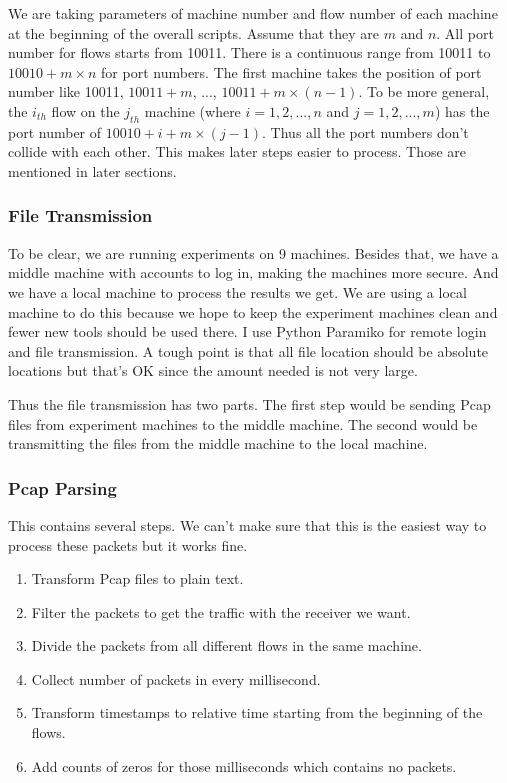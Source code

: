 \documentclass[12pt,a4paper]{article}
\begin{document}
We are taking parameters of machine number and flow number of each machine at the beginning of the overall scripts.
Assume that they are $m$ and $n$.
All port number for flows starts from 10011. There is a continuous range from 10011 to $10010+m\times n$ for port numbers.
The first machine takes the position of port number like 10011, $10011+m$, ..., $10011+m\times(n-1)$.
To be more general, the $i_{th}$ flow on the $j_{th}$ machine (where $i=1,2,...,n$ and $j=1,2,...,m$) has the port number of
$10010+i+m\times(j-1)$.
Thus all the port numbers don't collide with each other. This makes later steps easier to process.
Those are mentioned in later sections.

\subsubsection{File Transmission}
To be clear, we are running experiments on 9 machines.
Besides that, we have a middle machine with accounts to log in, making the machines more secure.
And we have a local machine to process the results we get. We are using a local machine to do this because
we hope to keep the experiment machines clean and fewer new tools should be used there.
I use Python Paramiko for remote login and file transmission.
A tough point is that all file location should be absolute locations but that's OK since the amount needed is not very large.

Thus the file transmission has two parts. The first step would be sending Pcap files from experiment machines to the middle machine.
The second would be transmitting the files from the middle machine to the local machine.

\subsubsection{Pcap Parsing}
This contains several steps. We can't make sure that this is the easiest way to process these packets but it works fine.
\begin{enumerate}
	\item Transform Pcap files to plain text.
	\item Filter the packets to get the traffic with the receiver we want.
	\item Divide the packets from all different flows in the same machine.
	\item Collect number of packets in every millisecond.
	\item Transform timestamps to relative time starting from the beginning of the flows.
	\item Add counts of zeros for those milliseconds which contains no packets.
\end{enumerate}
\end{document}
